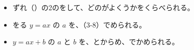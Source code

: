 \makeatletter
\newcommand\bkthrqline[1]{\par\addvspace{3pt}{\centering #1\par}\addvspace{3pt}}
\newcommand\bkthrqstep[1]{\par\addvspace{6pt}\noindent{\sffamily\bfseries\color{bkDeep}#1}\par\nobreak\vspace{2pt}}
\def\bkthrqsora{(0,0) (1,1.6) (2,2.9) (3,4.6) (4,5.9) (5,7.6) (6,8.9)}
\def\bkthrqbane{(1,22) (2,39) (3,60)}
\makeatother


\begin{goal}
\begin{itemize}[label={\color{\bkTT}●}, leftmargin=1.6\zw, itemsep=0pt, topsep=1pt]
\item {}\enspace ずれ（）の2のをして、どのがよくうかをくらべられる。
\item {}\enspace {}をる $y=ax$ の $a$ を、（3-8）でめられる。
\item {}\enspace {} $y=ax+b$ の $a$ と $b$ を、とからめ、でかめられる。
\end{itemize}
\end{goal}

